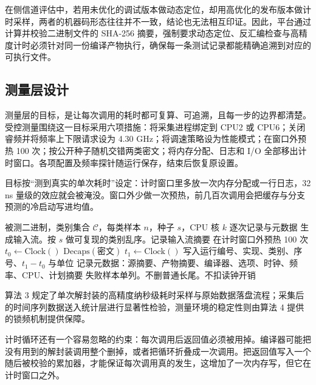 在侧信道评估中，若用未优化的调试版本做动态定位，却用高优化的发布版本做计时采样，两者的机器码形态往往并不一致，结论也无法相互印证。因此，平台通过计算并校验二进制文件的 SHA-256 摘要，强制要求动态定位、反汇编检查与高精度计时必须针对同一份编译产物执行，确保每一条测试记录都能精确追溯到对应的可执行文件。

\subsection{测量层设计}

测量层的目标，是让每次调用的耗时都可复算、可追溯，且每一步的边界都清楚。受控测量围绕这一目标采用六项措施：将采集进程绑定到 CPU2 或 CPU6；关闭睿频并将频率上下限请求设为 4.30 GHz；将调速策略设为性能模式；在窗口外预热 100 次；按公开种子随机交错两类密文；将内存分配、日志和 I/O 全部移出计时窗口。各项配置及频率探针随运行保存，结束后恢复原设置。


目标按“测到真实的单次耗时”设定：计时窗口里多放一次内存分配或一行日志，32 ns 量级的效应就会被淹没。窗口外少做一次预热，前几百次调用会把缓存与分支预测的冷启动写进均值。

\begin{algorithm}[H]
\caption{单次解封装的计时循环}
\label{alg:timing}
\begin{algorithmic}[1]
\Require 被测二进制，类别集合 $\mathcal{C}$，每类样本 $n$，种子 $s$，CPU 核 $k$
\Ensure 逐次记录与元数据
\State 生成输入流。按 $s$ 做可复现的类别乱序。记录输入流摘要
\State 在计时窗口外预热 100 次
  \State $t_0 \gets \mathrm{Clock}()$
  \State $\mathrm{Decaps}(\text{密文})$ 
  \State $t_1 \gets \mathrm{Clock}()$
  \State 写入运行编号、实现、类别、序号、$t_1-t_0$ 与单位
\EndFor
\State 记录元数据：源摘要、产物摘要、编译器、选项、时钟、频率、CPU、计划摘要
\State 失败样本单列。不删普通长尾。不扣读钟开销
\end{algorithmic}
\end{algorithm}

算法 3 规定了单次解封装的高精度纳秒级耗时采样与原始数据落盘流程；采集后的时间序列数据送入统计层进行显著性检验，测量环境的稳定性则由算法 4 提供的锁频机制提供保障。

计时循环还有一个容易忽略的约束：每次调用后返回值必须被用掉。编译器可能把没有用到的解封装调用整个删掉，或者把循环折叠成一次调用。把返回值写入一个随后被校验的累加器，才能保证每次调用真的发生，这增加了一次内存写，但它在计时窗口之外。

